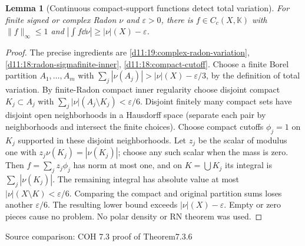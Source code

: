 \documentclass[11pt,oneside,openany]{book}
\newtheorem{lemma}[theorem]{Lemma}
\theoremstyle{definition}
\theoremstyle{remark}
\newcommand{\eps}{\varepsilon}\newcommand{\ee}{\varepsilon}
\newcommand{\family}[1]{}
\newcommand{\source}[1]{\par\begingroup\small\sffamily\color{black!65}Source comparison: #1\par\endgroup}
\begin{document}
\begin{lemma}[Continuous compact-support functions detect total variation]\family{D11.19.variation_test_function}\label{d11:19:variation-test-function}
For finite signed or complex Radon $\nu$ and $\eps>0$, there is $f\in C_c(X,\mathbb K)$ with $\|f\|_\infty\le1$ and $|\int f\dd\nu|\ge|\nu|(X)-\eps$.
\end{lemma}
\begin{proof}
The precise ingredients are \cref{d11:19:complex-radon-variation}, \cref{d11:18:radon-sigmafinite-inner}, \cref{d11:18:compact-cutoff}. Choose a finite Borel partition $A_1,\ldots,A_m$ with $\sum_j|\nu(A_j)|>|\nu|(X)-\eps/3$, by the definition of total variation. By finite-Radon compact inner regularity choose disjoint compact $K_j\subset A_j$ with $\sum_j|\nu|(A_j\setminus K_j)<\eps/6$. Disjoint finitely many compact sets have disjoint open neighborhoods in a Hausdorff space (separate each pair by neighborhoods and intersect the finite choices). Choose compact cutoffs $\phi_j=1$ on $K_j$ supported in these disjoint neighborhoods. Let $z_j$ be the scalar of modulus one with $z_j\nu(K_j)=|\nu(K_j)|$; choose any such scalar when the mass is zero. Then $f=\sum_j z_j\phi_j$ has norm at most one, and on $K=\bigcup K_j$ its integral is $\sum_j|\nu(K_j)|$. The remaining integral has absolute value at most $|\nu|(X\setminus K)<\eps/6$. Comparing the compact and original partition sums loses another $\eps/6$. The resulting lower bound exceeds $|\nu|(X)-\eps$. Empty or zero pieces cause no problem. No polar density or RN theorem was used.
\end{proof}
\source{COH 7.3 proof of Theorem7.3.6}
\end{document}
